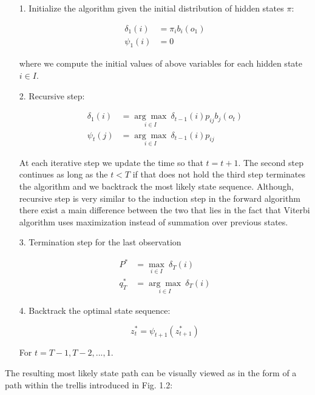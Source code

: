 \begin{itemize}
\item[1.] Initialize the algorithm given the initial distribution of hidden states $\pi$:

\begin{align}
\delta_1(i) &= \pi_i b_i(o_1)  \\
\psi_1(i)& = 0
\end{align}

where we compute the initial values of above variables for each hidden state $i \in I$.

\item[2.] Recursive step:

\begin{align}
\delta_1(i) &= \underset{i \in I}{\arg\max} \: \delta_{t-1}(i)p_{ij} b_j(o_t)  \\
\psi_t(j)& = \underset{i \in I}{\arg\max} \: \delta_{t-1}(i)p_{ij}
\end{align}

At each iterative step we update the time so that $t=t+1$. The second step continues as long as the $t<T$ if that does not hold the third step terminates the algorithm and we backtrack the most likely state sequence. Although, recursive step is very similar to the induction step in the forward algorithm there exist a main difference between the two that lies in the fact that Viterbi algorithm uses maximization instead of summation over previous states. 

\item[3.] Termination step for the last observation 

\begin{align}
P^* &= \underset{i \in I}{\max} \: \delta_{T}(i) \\
q_T^* & = \underset{i \in I}{\arg\max} \: \delta_{T}(i)
\end{align}

\item[4.] Backtrack the optimal state sequence:

\begin{equation}
z_t^* = \psi_{t+1}(z_{t+1}^*)
\end{equation}

For $t = T-1,T-2,...,1$.

\end{itemize}

The resulting most likely state path can be visually viewed as in the form of a path within the trellis introduced in Fig. 1.2:

